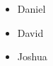 \documentclass{article}
\begin{document}
	\begin{itemize}
		\item Daniel
		\item David
		\item Joshua
	\end{itemize}
\end{document}
